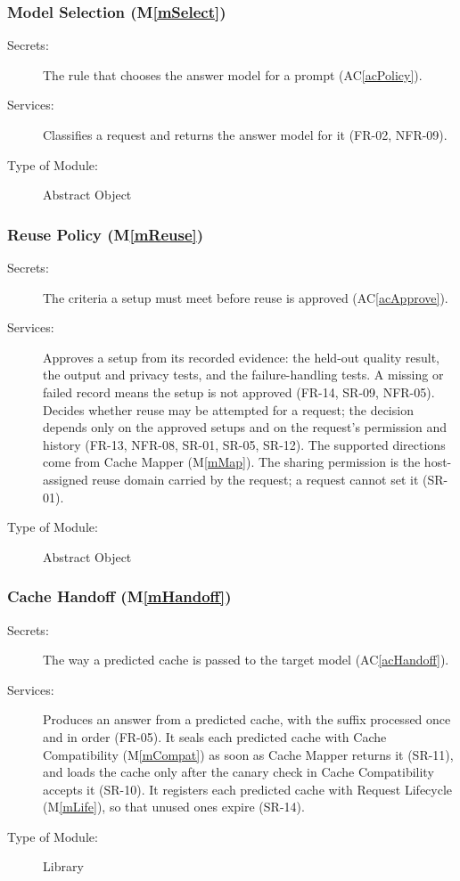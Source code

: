 \documentclass[12pt, titlepage]{article}
\newcommand{\acref}[1]{AC\ref{#1}}
\newcommand{\mref}[1]{M\ref{#1}}
\begin{document}
\subsubsection{Model Selection (\mref{mSelect})}

\begin{description}
\item[Secrets:] The rule that chooses the answer model for a prompt (\acref{acPolicy}).
\item[Services:] Classifies a request and returns the answer model for it
  (FR-02, NFR-09).
\item[Type of Module:] Abstract Object
\end{description}

\subsubsection{Reuse Policy (\mref{mReuse})}

\begin{description}
\item[Secrets:] The criteria a setup must meet before reuse is approved (\acref{acApprove}).
\item[Services:] Approves a setup from its recorded evidence: the held-out
  quality result, the output and privacy tests, and the failure-handling tests.
  A missing or failed record means the setup is not approved (FR-14, SR-09,
  NFR-05). Decides whether reuse may be attempted for a request; the decision
  depends only on the approved setups and on the request's permission and
  history (FR-13, NFR-08, SR-01, SR-05, SR-12). The supported directions come
  from Cache Mapper (\mref{mMap}). The sharing permission is the host-assigned
  reuse domain carried by the request; a request cannot set it (SR-01).
\item[Type of Module:] Abstract Object
\end{description}

\subsubsection{Cache Handoff (\mref{mHandoff})}

\begin{description}
\item[Secrets:] The way a predicted cache is passed to the target model (\acref{acHandoff}).
\item[Services:] Produces an answer from a predicted cache, with the suffix
  processed once and in order (FR-05). It seals each predicted cache with Cache
  Compatibility (\mref{mCompat}) as soon as Cache Mapper returns it (SR-11), and
  loads the cache only after the canary check in Cache Compatibility accepts it
  (SR-10). It registers each predicted cache with Request Lifecycle
  (\mref{mLife}), so that unused ones expire (SR-14).
\item[Type of Module:] Library
\end{description}
\end{document}
